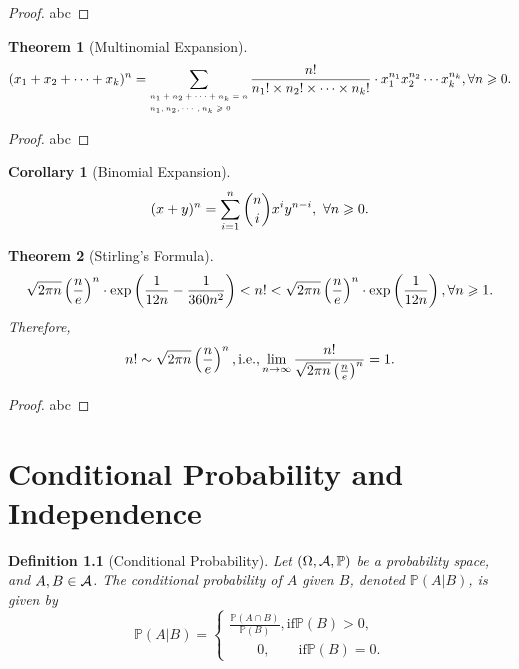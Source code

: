 \documentclass[openany,12pt]{book}
\newtheorem{theorem}{Theorem}[chapter]
\newtheorem{corollary}{Corollary}[chapter]
\newtheorem{definition}{Definition}[chapter]
\begin{document}
\begin{proof}
  abc
\end{proof}

\begin{theorem}[Multinomial Expansion]
  $$(x_1+x_2+\cdots+x_k)^n=\sum_
    {\mbox{\tiny $\begin{aligned}
             & n_1+n_2+\cdots+n_k=n    \\
             & n_1,n_2, \cdots,n_k\geqslant0
          \end{aligned}$}}
    \frac{n!}{n_1 !\times n_2 !\times\cdots\times n_k !}\cdot x_1^{n_1 } x_2^{n_2 }\cdots x_k^{n_k},\forall n\geqslant0.$$
\end{theorem}

\begin{proof}
  abc
\end{proof}

\begin{corollary}[Binomial Expansion]
  $$(x+y)^n=\sum_{i=1}^{n}\binom n i  x^i y^{n-i},~\forall n\geqslant 0.$$
\end{corollary}

\begin{theorem}[Stirling's Formula]
  $$\sqrt{2\pi n}
    \left(\frac{n}{e}\right)^n
    \cdot
    \exp\left(\frac{1}{12n}-\frac{1}{360 n^2 }\right)
    <n!
    <\sqrt{2\pi n}
    \left(\frac{n}{e}\right)^n
    \cdot\exp\left(\frac{1}{12n}\right),
    \forall n\geqslant1.$$
  Therefore,
  $$n!\sim\sqrt{2\pi n} \left(\frac{n}{e}\right)^n, \text{i.e.}, \lim_{n\to\infty} \frac{n!}{\sqrt{2\pi n} \left(\frac{n}{e}\right)^n}=1.$$
\end{theorem}

\begin{proof}
  abc
\end{proof}

\chapter{Conditional Probability and Independence}

\begin{definition}[Conditional Probability]
  Let $(\Omega,\mathcal{A},\mathbb{P})$ be a probability space, and $A,B\in\mathcal{A}$. The conditional probability of $A$ given $B$, denoted $\mathbb{P}(A|B)$, is given by
  $$\mathbb{P}(A|B)=
    \begin{cases}
      \frac{\mathbb{P}(A\cap B)}{\mathbb{P}(B)}, \text{if}  \mathbb{P}(B)>0, \\
      \qquad 0         ,\qquad \text{if}  \mathbb{P}(B)=0.
    \end{cases}
  $$
\end{definition}
\end{document}
